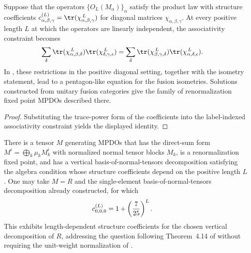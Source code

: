 \begin{lemma}%
    \label{thm:mpdo_bnt_label_chi_associativity}
    \leanok
    Suppose that the operators $\{O_L(M_\alpha)\}_\alpha$ satisfy the product
    law with structure coefficients
    $c^{(L)}_{\alpha,\beta,\gamma}=\tr(\chi_{\alpha,\beta,\gamma}^{\,L})$
    for diagonal matrices $\chi_{\alpha,\beta,\gamma}$.
    At every positive length $L$ at which the operators are linearly
    independent, the associativity constraint becomes
    \begin{align}
        \sum_\delta
        \tr(\chi_{\alpha,\beta,\delta}^{\,L})
        \tr(\chi_{\delta,\gamma,\epsilon}^{\,L})
         & =
        \sum_\delta
        \tr(\chi_{\beta,\gamma,\delta}^{\,L})
        \tr(\chi_{\alpha,\delta,\epsilon}^{\,L}).
        \notag
    \end{align}
    In \cite[Section~4.5]{Cirac2016MPDO_arXiv}, these restrictions in the
    positive diagonal setting, together with the isometry statement, lead
    to a pentagon-like equation for the fusion isometries. Solutions
    constructed from unitary fusion categories give the family of
    renormalization fixed point MPDOs described there.
\end{lemma}
\begin{proof}\leanok
    Substituting the trace-power form of the coefficients into the label-indexed
    associativity constraint yields the displayed identity.
\end{proof}

\begin{lemma}%
    \label{thm:mpdo_bnt_label_rescaling_stable_rfp_capstone}
    \leanok
    There is a tensor $M$ generating MPDOs that has the direct-sum form
    $M^i=\bigoplus_k\mu_k M_k^i$ with normalized normal tensor blocks $M_k$, is a
    renormalization fixed point, and has a vertical basis-of-normal-tensors decomposition
    satisfying the algebra condition whose structure coefficients depend on
    the positive length $L$. One may take $M=R$ and the single-element
    basis-of-normal-tensors decomposition already constructed, for which
    \begin{align}
        c^{(L)}_{0,0,0} & =1+\left(\frac{7}{25}\right)^L.
        \notag
    \end{align}
    This exhibits length-dependent structure coefficients for the chosen
    vertical decomposition of $R$, addressing the question following
    Theorem~4.14 of \cite{Cirac2016MPDO_arXiv} without requiring the unit-weight
    normalization of \cite{gap:cpsv16_unit_weight_rfp_scale_tension}.
\end{lemma}

